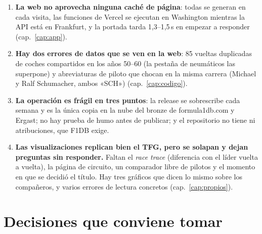 \documentclass[11pt,openany]{report}
\begin{document}
\begin{enumerate}
  que se duerme a los 15 minutos para servir datos que solo cambian los lunes
  (cap.~\ref{cap:alternativas}).
  \item \textbf{La web no aprovecha ninguna caché de página}: todas se generan en cada visita, las
  funciones de Vercel se ejecutan en Washington mientras la API está en Frankfurt, y la portada tarda
  1,3–1,5\,s en empezar a responder (cap.~\ref{cap:app}).
  \item \textbf{Hay dos errores de datos que se ven en la web}: 85 vueltas duplicadas de coches
  compartidos en los años 50–60 (la pestaña de neumáticos las superpone) y abreviaturas de piloto que
  chocan en la misma carrera (Michael y Ralf Schumacher, ambos «SCH») (cap.~\ref{cap:codigo}).
  \item \textbf{La operación es frágil en tres puntos}: la release  se sobrescribe
  cada semana y es la única copia en la nube del bronze de formula1db.com y Ergast; no hay prueba de
  humo antes de publicar; y el repositorio no tiene  ni atribuciones, que F1DB exige.
  \item \textbf{Las visualizaciones replican bien el TFG, pero se solapan y dejan preguntas sin
  responder.} Faltan el \emph{race trace} (diferencia con el líder vuelta a vuelta), la página de
  circuito, un comparador libre de pilotos y el momento en que se decidió el título. Hay tres
  gráficos que dicen lo mismo sobre los compañeros, y varios errores de lectura concretos
  (cap.~\ref{cap:propios}).
\end{enumerate}

\section{Decisiones que conviene tomar}
\end{document}
